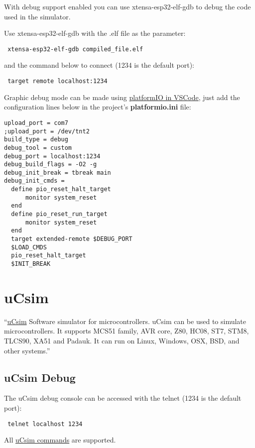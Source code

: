  With debug support enabled you can use xtensa-esp32-elf-gdb to debug the code used in the simulator. 
 
 Use xtensa-esp32-elf-gdb with the .elf file as the parameter:
 \begin{verbatim}
 xtensa-esp32-elf-gdb compiled_file.elf
 \end{verbatim}
 and the command below to connect (1234 is the default port):
 \begin{verbatim}
 target remote localhost:1234
 \end{verbatim}

Graphic debug mode can be made using \href{https://platformio.org/}{platformIO in VSCode}, just add the configuration lines below in the project's \textbf{platformio.ini} file:
\begin{verbatim}
upload_port = com7
;upload_port = /dev/tnt2
build_type = debug
debug_tool = custom
debug_port = localhost:1234
debug_build_flags = -O2 -g
debug_init_break = tbreak main
debug_init_cmds =
  define pio_reset_halt_target
      monitor system_reset
  end
  define pio_reset_run_target
      monitor system_reset
  end
  target extended-remote $DEBUG_PORT
  $LOAD_CMDS
  pio_reset_halt_target
  $INIT_BREAK
\end{verbatim}
 
 
\section{uCsim} \hypertarget{def:ucsim}{}
``\href{http://mazsola.iit.uni-miskolc.hu/\%7edrdani/embedded/ucsim/}{uCsim} Software simulator for microcontrollers. uCsim can be used to simulate microcontrollers. It supports MCS51 family, AVR core, Z80, HC08, ST7, STM8, TLCS90, XA51 and Padauk. It can run on Linux, Windows, OSX, BSD, and other systems.''

\subsection{uCsim Debug} \hypertarget{def:ucsim}{}
  
The uCsim debug console can be accessed with the telnet (1234 is the default port):
 \begin{verbatim}
 telnet localhost 1234
 \end{verbatim}
 
All \href{http://mazsola.iit.uni-miskolc.hu/\%7edrdani/embedded/ucsim/cmd.html}{uCsim commands} are supported.  

